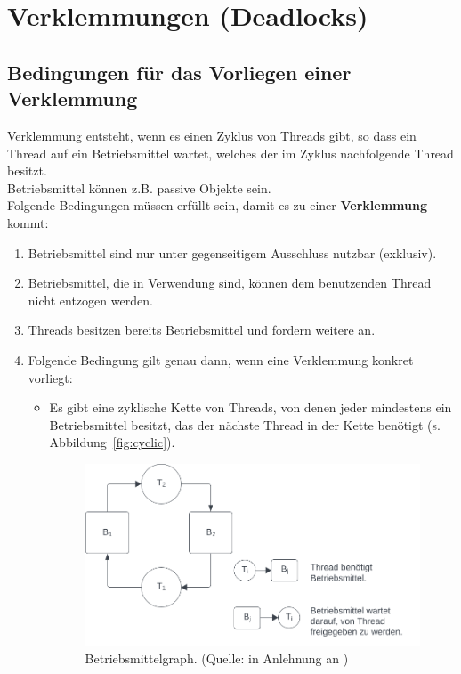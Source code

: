 \section{Verklemmungen (Deadlocks)}

 \subsection{Bedingungen für das Vorliegen einer Verklemmung}
Verklemmung entsteht, wenn es einen Zyklus von Threads gibt, so dass ein Thread auf ein Betriebsmittel wartet, welches der im Zyklus nachfolgende Thread besitzt.\\
Betriebsmittel können z.B. passive Objekte sein.\\

\noindent
Folgende Bedingungen müssen erfüllt sein, damit es zu einer \textbf{Verklemmung} kommt:

\begin{enumerate}
    \item Betriebsmittel sind nur unter gegenseitigem Ausschluss nutzbar (exklusiv).
    \item Betriebsmittel, die in Verwendung sind, können dem benutzenden Thread nicht entzogen werden.
    \item Threads besitzen bereits Betriebsmittel und fordern weitere an.
    \item Folgende Bedingung gilt genau dann, wenn eine Verklemmung konkret vorliegt:
    \begin{itemize}
        \item[] Es gibt eine zyklische Kette von Threads, von denen jeder mindestens ein Betriebsmittel besitzt, das der nächste Thread in der Kette benötigt (s. Abbildung~\ref{fig:cyclic}).
        \begin{figure}
            \centering
            \includegraphics[scale=0.5]{chapters/fopt2/img/cyclic}
            \caption{Betriebsmittelgraph. (Quelle: in Anlehnung an \cite[192, Bild 3.9]{Oec22})}
        \end{figure}
    \end{itemize}
\end{enumerate}

